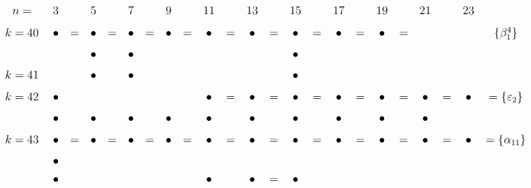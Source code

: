 \documentclass{article}
\begin{document}
\(
\begin{tikzcd}[nodes={font=\large},row sep=0.2cm,column sep=0.1cm]
n= & & 3 & & 5 & & 7 & & 9 & & 11 & & 13 & & 15 & & 17 && 19 && 21 && 23 \\
k=40 && \bullet &=& \bullet &=& \bullet &=& \bullet &=& \bullet &=& \bullet &=& \bullet &=& \bullet &=& \bullet &=&&&& \{\beta_1^4\} \\
&&&& \bullet && \bullet && && && && \bullet &&  \\
k=41 &&&& \bullet && \bullet && && && && \bullet &&  \\
k=42 && \bullet && && && && \bullet &=& \bullet &=& \bullet &=& \bullet  &=& \bullet  &=& \bullet  &=& \bullet & =\{\varepsilon_2\} \\
 && \bullet && \bullet && \bullet && \bullet && \bullet && \bullet && \bullet && \bullet && \bullet && \bullet \\
k=43 && \bullet &=& \bullet &=& \bullet &=& \bullet &=& \bullet &=& \bullet &=& \bullet &=& \bullet  &=& \bullet &=& \bullet&=& \bullet & = \{\alpha_{11}\} \\
&& \bullet && && && \\
&& \bullet && && && && \bullet && \bullet &=& \bullet   \\
\\
\end{tikzcd}
\)
\end{document}
